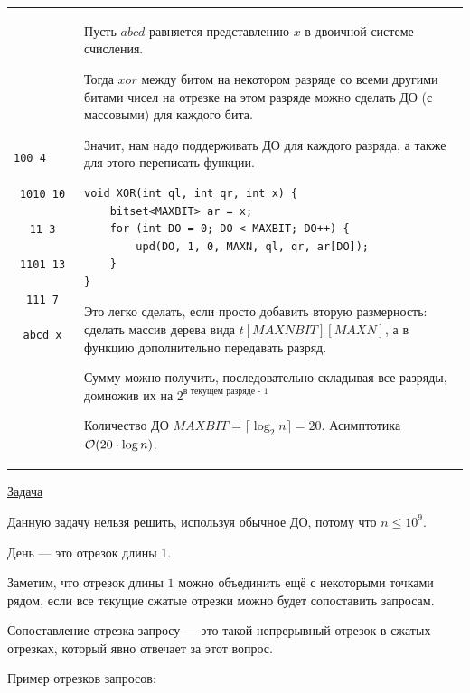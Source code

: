 \down
\begin{tabular}{cm{}}
	\begin{minipage}{2.5cm}
		\begin{verbatim}
			100 4    
			1010 10
			11 3
			1101 13
			111 7
			abcd x
		\end{verbatim}
	\end{minipage} 
	&
	Пусть $abcd$ равняется представлению $x$ в двоичной системе счисления.
	
	Тогда $xor$ между битом на некотором разряде со всеми другими битами чисел на отрезке на этом разряде можно сделать ДО (с массовыми) для каждого бита.
	
	Значит, нам надо поддерживать ДО для каждого разряда, а также для этого переписать функции.
	
	\up \up
	\begin{verbatim}
void XOR(int ql, int qr, int x) {
	bitset<MAXBIT> ar = x;
	for (int DO = 0; DO < MAXBIT; DO++) {
		upd(DO, 1, 0, MAXN, ql, qr, ar[DO]);
	}
}
	\end{verbatim}
	\up \up
	
	
	Это легко сделать, если просто добавить вторую размерность: сделать массив дерева вида $t[MAXNBIT][MAXN]$,  а в функцию дополнительно передавать разряд.
	
	Сумму можно получить, последовательно складывая все разряды, домножив их на $2^{\text{в текущем разряде - 1}}$
	
	Количество ДО $MAXBIT=\lceil\log_2 n\rceil = 20$. Асимптотика $\mathcal{O}(20 \cdot \log n)$.
\end{tabular}

\pagebreak


\href{https://codeforces.com/contest/915/problem/E}{Задача}
\href{https://codeforces.com/contest/915/submission/106223693}{}

Данную задачу нельзя решить, используя обычное ДО, потому что $n \le 10^9$.

День --- это отрезок длины $1$.

Заметим, что отрезок длины $1$ можно объединить ещё с некоторыми точками рядом, если все текущие сжатые отрезки можно будет сопоставить запросам.

Сопоставление отрезка запросу --- это такой непрерывный отрезок в сжатых отрезках, который явно отвечает за этот вопрос.
\down

Пример отрезков запросов:

